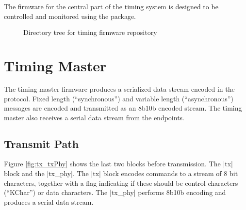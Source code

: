 \documentclass{dune}
\begin{document}
The firmware for the central part of the timing system is designed to be controlled and monitored using the  package.

\begin{figure}[h!]
\renewcommand*\DTstylecomment{\color{blue}}
\renewcommand*\DTstyle{\ttfamily\textcolor{red}}
    \caption{Directory tree for timing firmware repository}
    \label{fig:timingRepoDirectories}
\end{figure}

\section{Timing Master}

The timing master firmware produces a serialized data stream encoded in the    protocol\cite{ref:dts-sp-timing-protocol}. Fixed length (``synchronous'') and variable length (``asynchronous'') messages are encoded and transmitted as an 8b10b encoded stream. The timing master also receives a serial data stream from the endpoints.

\subsection{Transmit Path}
Figure \ref{fig:tx_txPhy} shows the last two blocks before transmission. The |tx| block and the |tx_phy|. The |tx| block encodes commands to a stream of 8 bit characters, together with a flag indicating if these should be control characters (``KChar'') or data characters. The |tx_phy| performs 8b10b encoding and produces a serial data stream. 
\end{document}
